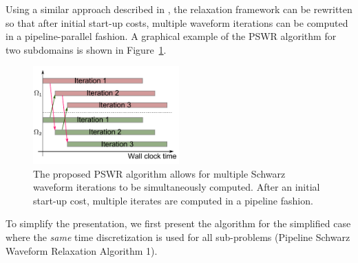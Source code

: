 \documentclass{svmult-ddm}
\begin{document}
Using a similar approach described in
\cite{ChristliebMacdonaldOng2010,MR1340665}, the relaxation framework can be
rewritten so that after initial start-up costs, multiple waveform
iterations can be computed in a pipeline-parallel fashion. A graphical
example of the PSWR algorithm for two subdomains is shown in
Figure~\ref{ongbw_mini_13_sec:pswr_fig}.
\begin{figure}
  \centering
  \includegraphics[width=0.5\textwidth]{figure1}
  \caption{The proposed PSWR algorithm allows for multiple Schwarz
    waveform iterations to be simultaneously computed.  After an
    initial start-up cost, multiple iterates are computed in a
    pipeline fashion.}
  \label{ongbw_mini_13_sec:pswr_fig}
\end{figure}
To simplify
the presentation, 
%
we first present the algorithm for the simplified case where 
the {\em same} time discretization is used for all sub-problems
(Pipeline Schwarz Waveform Relaxation Algorithm 1).
\end{document}
